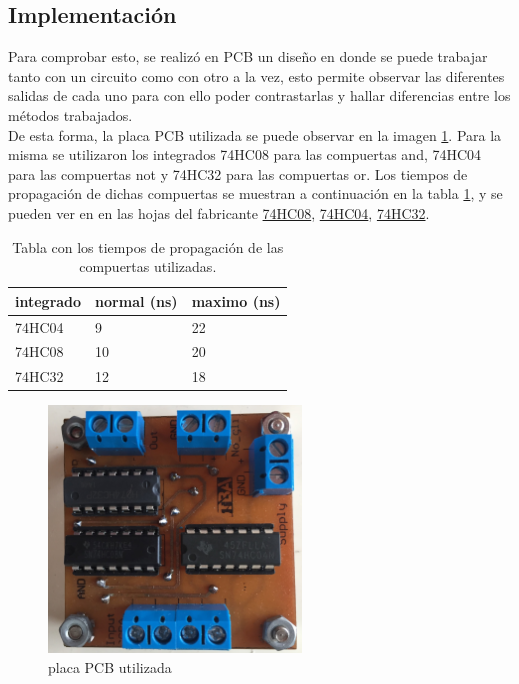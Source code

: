 \subsection{Implementaci\'on}
%
\noindent
Para comprobar esto, se realiz\'o en PCB un diseño en donde se puede trabajar tanto con un circuito como con otro a la vez, esto permite observar las diferentes salidas de cada uno para con ello poder contrastarlas y hallar diferencias entre los métodos trabajados.\\
\noindent
De esta forma, la placa PCB utilizada se puede observar en la imagen \ref{ej3_placa}.
Para la misma se utilizaron los integrados 74HC08 para las compuertas and, 74HC04 para las compuertas not y 74HC32 para las compuertas or. Los tiempos de propagación de dichas compuertas se muestran a continuación en la tabla \ref{tabla_comp_tiempos_prop}, y se pueden ver en en las hojas del fabricante \href{http://www.ti.com/lit/ds/symlink/sn74hc08.pdf}{74HC08}, \href{http://www.ti.com/lit/ds/symlink/sn74hc04.pdf}{74HC04}, \href{http://www.ti.com/lit/ds/symlink/sn74hc32.pdf}{74HC32}.
%
\begin{table}[H]
\caption{Tabla con los tiempos de propagación de las compuertas utilizadas.}
\label{tabla_comp_tiempos_prop}
\centering
\begin{tabular}{|l||l|l|}
\hline
integrado & normal (ns) & maximo (ns) \\ \hline \hline
74HC04    & 9      & 22     \\ \hline
74HC08    & 10     & 20     \\ \hline
74HC32    & 12     & 18     \\ \hline
\end{tabular}
\end{table}
%
%
%
\begin{figure}[H]
    \centering
        \centering
        \includegraphics[width=0.6\textwidth]{figs/Ej3/Circuito_PCB.jpg} %
         \caption{placa PCB utilizada}
         \label{ej3_placa}
\end{figure}
%
